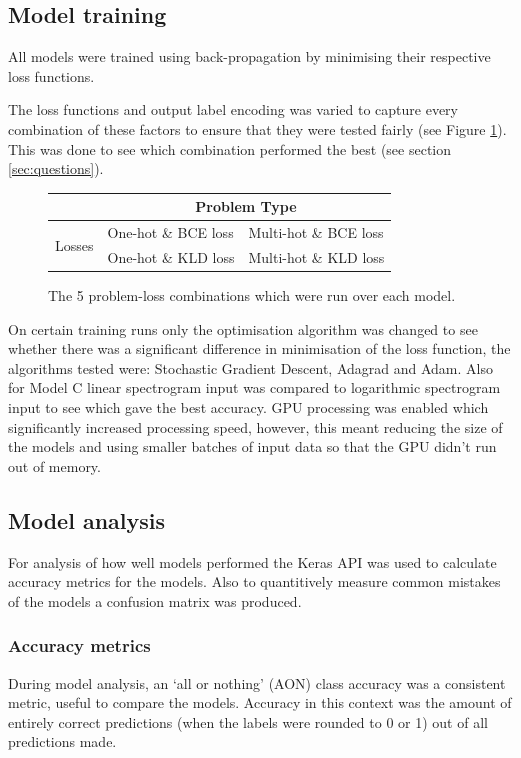 \documentclass[12pt]{article}
\begin{document}
    \subsection{Model training}
    All models were trained using back-propagation by minimising their respective loss functions.\medskip
    
    The loss functions and output label encoding was varied to capture every combination of these factors to ensure that they were tested fairly (see Figure \ref{fig:test_table}). This was done to see which combination performed the best (see section \ref{sec:questions}).\medskip
    
    \begin{figure}[H]
    \begin{tabular}{l|l|l|}
                                & \multicolumn{2}{c|}{Problem Type} \\
        \hline
        \multirow{2}{*}{Losses}  & One-hot \& BCE loss & Multi-hot \& BCE loss\\
        \cline{2-3}
        & One-hot \& KLD loss & Multi-hot \& KLD loss\\
        \hline
    \end{tabular}
    \caption{The 5 problem-loss combinations which were run over each model.}
    \label{fig:test_table}
    \end{figure}
    
    On certain training runs only the optimisation algorithm was changed to see whether there was a significant difference in minimisation of the loss function, the algorithms tested were: Stochastic Gradient Descent, Adagrad and Adam. Also for Model C linear spectrogram input was compared to logarithmic spectrogram input to see which gave the best accuracy. GPU processing was enabled which significantly increased processing speed, however, this meant reducing the size of the models and using smaller batches of input data so that the GPU didn't run out of memory.
    
    \subsection{Model analysis}
    For analysis of how well models performed the Keras API was used to calculate accuracy metrics for the models. Also to quantitively measure common mistakes of the models a confusion matrix was produced. 
    
    \subsubsection{Accuracy metrics}
    During model analysis, an `all or nothing' (AON) class accuracy was a consistent metric, useful to compare the models. Accuracy in this context was the amount of entirely correct predictions (when the labels were rounded to 0 or 1) out of all predictions made.\medskip
    
\end{document}
